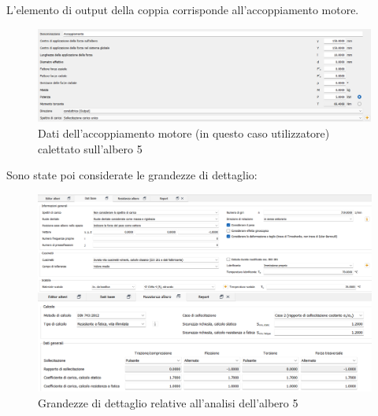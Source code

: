 L'elemento di output  della coppia corrisponde all'accoppiamento motore.
\begin{figure}[h]
    \centering
    \includegraphics[scale=0.6]{Immagini/MomentoAlbero5.png}
    \caption{Dati dell'accoppiamento motore (in questo caso utilizzatore) calettato sull'albero 5}
    \label{fig:MomentoAlbero5}
    \end{figure}
\newpage
Sono state poi considerate le grandezze di dettaglio:
\begin{figure}[h]
    \centering
        \includegraphics[scale=0.6]{Immagini/DettagliAlbero5.png}
    \caption{Grandezze di dettaglio relative all'analisi dell'albero 5}
    \label{fig:DettagliAlbero5}
\end{figure}

